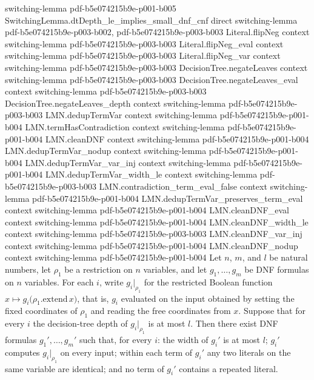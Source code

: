 \begin{lemma}
  {switching-lemma}
  {pdf-b5e074215b9e-p001-b005}
\proofstep
  {SwitchingLemma.dtDepth_le_implies_small_dnf_cnf}
  {direct}
  {switching-lemma}
  {pdf-b5e074215b9e-p003-b002,
    pdf-b5e074215b9e-p003-b003}
\proofstep
  {Literal.flipNeg}
  {context}
  {switching-lemma}
  {pdf-b5e074215b9e-p003-b003}
\proofstep
  {Literal.flipNeg_eval}
  {context}
  {switching-lemma}
  {pdf-b5e074215b9e-p003-b003}
\proofstep
  {Literal.flipNeg_var}
  {context}
  {switching-lemma}
  {pdf-b5e074215b9e-p003-b003}
\proofstep
  {DecisionTree.negateLeaves}
  {context}
  {switching-lemma}
  {pdf-b5e074215b9e-p003-b003}
\proofstep
  {DecisionTree.negateLeaves_eval}
  {context}
  {switching-lemma}
  {pdf-b5e074215b9e-p003-b003}
\proofstep
  {DecisionTree.negateLeaves_depth}
  {context}
  {switching-lemma}
  {pdf-b5e074215b9e-p003-b003}
\proofstep
  {LMN.dedupTermVar}
  {context}
  {switching-lemma}
  {pdf-b5e074215b9e-p001-b004}
\proofstep
  {LMN.termHasContradiction}
  {context}
  {switching-lemma}
  {pdf-b5e074215b9e-p001-b004}
\proofstep
  {LMN.cleanDNF}
  {context}
  {switching-lemma}
  {pdf-b5e074215b9e-p001-b004}
\proofstep
  {LMN.dedupTermVar_nodup}
  {context}
  {switching-lemma}
  {pdf-b5e074215b9e-p001-b004}
\proofstep
  {LMN.dedupTermVar_var_inj}
  {context}
  {switching-lemma}
  {pdf-b5e074215b9e-p001-b004}
\proofstep
  {LMN.dedupTermVar_width_le}
  {context}
  {switching-lemma}
  {pdf-b5e074215b9e-p003-b003}
\proofstep
  {LMN.contradiction_term_eval_false}
  {context}
  {switching-lemma}
  {pdf-b5e074215b9e-p001-b004}
\proofstep
  {LMN.dedupTermVar_preserves_term_eval}
  {context}
  {switching-lemma}
  {pdf-b5e074215b9e-p001-b004}
\proofstep
  {LMN.cleanDNF_eval}
  {context}
  {switching-lemma}
  {pdf-b5e074215b9e-p001-b004}
\proofstep
  {LMN.cleanDNF_width_le}
  {context}
  {switching-lemma}
  {pdf-b5e074215b9e-p003-b003}
\proofstep
  {LMN.cleanDNF_var_inj}
  {context}
  {switching-lemma}
  {pdf-b5e074215b9e-p001-b004}
\proofstep
  {LMN.cleanDNF_nodup}
  {context}
  {switching-lemma}
  {pdf-b5e074215b9e-p001-b004}
Let $n$, $m$, and $l$ be natural numbers, let $\rho_1$ be a restriction on $n$
variables, and let $g_1, \dots, g_m$ be DNF formulas on $n$ variables. For each $i$,
write $g_i|_{\rho_1}$ for the restricted Boolean function $x \mapsto
g_i\bigl(\rho_1.\mathrm{extend}\,x\bigr)$, that is, $g_i$ evaluated on the input
obtained by setting the fixed coordinates of $\rho_1$ and reading the free coordinates
from $x$. Suppose that for every $i$ the decision-tree depth of $g_i|_{\rho_1}$ is at
most $l$. Then there exist DNF formulas $g_1', \dots, g_m'$ such that, for every $i$:
the width of $g_i'$ is at most $l$; $g_i'$ computes $g_i|_{\rho_1}$ on every input;
within each term of $g_i'$ any two literals on the same variable are identical; and no
term of $g_i'$ contains a repeated literal.
\end{lemma}
